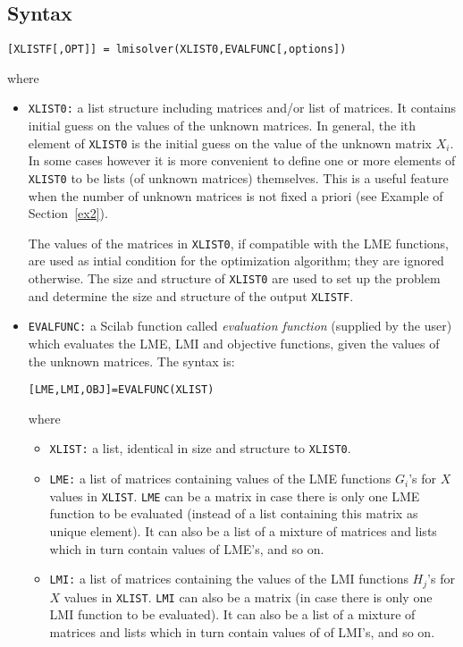 \documentclass{article}
\begin{document}
\subsection{Syntax} 
\begin{verbatim}
[XLISTF[,OPT]] = lmisolver(XLIST0,EVALFUNC[,options])
\end{verbatim}
where
\begin{itemize}

\item {\tt XLIST0:} a list structure including matrices and/or list of matrices.
It contains initial guess on the values of the unknown matrices. In general, the
ith element of {\tt XLIST0} is the initial guess on the value of the
unknown matrix $X_i$. In some cases
however it is more convenient to define one or more elements of
{\tt XLIST0} to be lists (of unknown matrices) themselves. This is a
useful feature when the number of unknown matrices is not fixed a priori
(see Example of Section~\ref{ex2}).

The values of the matrices in {\tt XLIST0}, if compatible with the LME functions, 
are used as intial condition for the optimization algorithm; they are
ignored otherwise. The size and structure of {\tt XLIST0} are used to
set up the problem and determine the size and structure of the output {\tt XLISTF}.

\item
{\tt EVALFUNC:} a Scilab function called {\em evaluation function}
(supplied by the user)
which evaluates the LME, LMI and objective functions, given the values of the
unknown matrices. The syntax is:
\begin{verbatim}
[LME,LMI,OBJ]=EVALFUNC(XLIST)
\end{verbatim}
where
\begin{itemize}
\item {\tt XLIST:} a list, identical in size and structure to {\tt XLIST0}.

\item {\tt LME:} a list of matrices containing values of the LME
functions $G_i$'s
for $X$ values in {\tt XLIST}. {\tt LME} can be a matrix in case
there is only one LME function to be evaluated (instead of a list
containing this matrix as unique element). It can also be a list
of a mixture of matrices and lists which in turn contain values of
LME's, and so on.

\item {\tt LMI:} a list of matrices containing the values of the LMI
functions $H_j$'s
for $X$ values in {\tt XLIST}. {\tt LMI} can also be a matrix (in case
there is only one LMI function to be evaluated). It can also be a list
of a mixture of matrices and lists which in turn contain values of
of LMI's, and so on.


\end{itemize}
\end{itemize}
\end{document}
